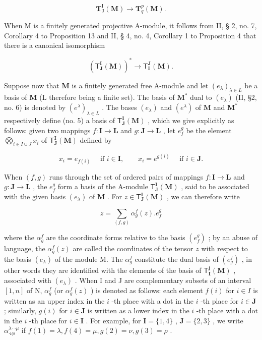 \[
\mathbf {T} _ {\mathrm{J}} ^ {\mathrm{I}} (\mathbf {M}) \rightarrow \mathbf {T} _ {q} ^ {p} (\mathbf {M}).
\]

When M is a finitely generated projective A-module, it follows from II, § 2, no. 7, Corollary 4 to Proposition 13 and II, § 4, no. 4, Corollary 1 to Proposition 4 that there is a canonical isomorphism

\[
(\mathsf {T} _ {\mathbf {J}} ^ {\mathbf {I}} (\mathbf {M})) ^ {*} \to \mathsf {T} _ {\mathbf {I}} ^ {\mathbf {J}} (\mathbf {M}).
\]

Suppose now that \(\mathbf{M}\) is a finitely generated free A-module and let \((e_{\lambda})_{\lambda \in L}\) be a basis of \(\mathbf{M}\) (L therefore being a finite set). The basis of \(\mathbf{M}^*\) dual to \((e_{\lambda})\) (II, §2, no. 6) is denoted by \((e^{\lambda})_{\lambda \in L}\) . The bases \((e_{\lambda})\) and \((e^{\lambda})\) of \(\mathbf{M}\) and \(\mathbf{M}^*\) respectively define (no. 5) a basis of \(\mathsf{T}_{\mathbf{J}}^{\mathbf{I}}(\mathbf{M})\) , which we give explicitly as follows: given two mappings \(f\colon \mathbf{I} \to \mathbf{L}\) and \(g\colon \mathbf{J} \to \mathbf{L}\) , let \(e_f^g\) be the element \(\bigotimes_{i \in I \cup J} x_i\) of \(\mathsf{T}_{\mathbf{J}}^{\mathbf{I}}(\mathbf{M})\) defined by

\[
x _ {i} = e _ {f (i)} \quad \text { if } i \in \mathbf {I}, \qquad x _ {i} = e ^ {g (i)} \quad \text { if } i \in \mathbf {J}.
\]

When \((f, g)\) runs through the set of ordered pairs of mappings \(f: \mathbf{I} \to \mathbf{L}\) and \(g: \mathbf{J} \to \mathbf{L}\) , the \(e_f^g\) form a basis of the A-module \(\mathsf{T}_{\mathbf{J}}^{\mathbf{I}}(\mathbf{M})\) , said to be associated with the given basis \((e_{\lambda})\) of \(\mathbf{M}\) . For \(z \in \mathsf{T}_{\mathbf{J}}^{\mathbf{I}}(\mathbf{M})\) , we can therefore write

\[
z = \sum_ {(f, g)} \alpha_ {g} ^ {f} (z). e _ {f} ^ {g}\tag{12}
\]

where the \(\alpha_g^f\) are the coordinate forms relative to the basis \((e_f^g)\) ; by an abuse of language, the \(\alpha_g^f(z)\) are called the coordinates of the tensor \(z\) with respect to the basis \((e_\lambda)\) of the module M. The \(\alpha_g^f\) constitute the dual basis of \((e_g^f)\) , in other words they are identified with the elements of the basis of \(\mathsf{T}_{\mathbf{I}}^{\mathbf{j}}(\mathbf{M})\) , associated with \((e_\lambda)\) . When I and J are complementary subsets of an interval \([1,n]\) of N, \(\alpha_g^f\) (or \(\alpha_g^f(z)\) ) is denoted as follows: each element \(f(i)\) for \(i\in I\) is written as an upper index in the \(i\) -th place with a dot in the \(i\) -th place for \(i \in \mathbf{J}\) ; similarly, \(g(i)\) for \(i \in \mathbf{J}\) is written as a lower index in the \(i\) -th place with a dot in the \(i\) -th place for \(i \in \mathbf{I}\) . For example, for \(\mathbf{I} = \{1, 4\}\) , \(\mathbf{J} = \{2, 3\}\) , we write \(\alpha_{\cdot \nu \rho}^{\lambda \cdot \cdot \mu}\) if \(f(1) = \lambda, f(4) = \mu, g(2) = \nu, g(3) = \rho\) .

